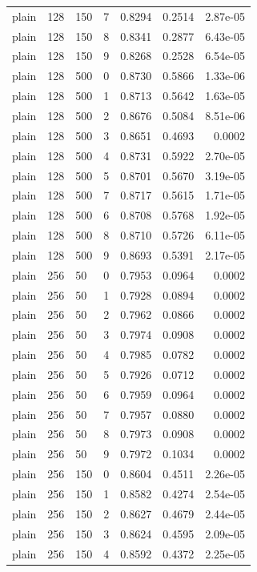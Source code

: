 \begin{footnotesize}
\begin{longtable}{lllrrrr}
plain & 128 & 150 & 7 & 0.8294 & 0.2514 & 2.87e-05 \\
plain & 128 & 150 & 8 & 0.8341 & 0.2877 & 6.43e-05 \\
plain & 128 & 150 & 9 & 0.8268 & 0.2528 & 6.54e-05 \\
plain & 128 & 500 & 0 & 0.8730 & 0.5866 & 1.33e-06 \\
plain & 128 & 500 & 1 & 0.8713 & 0.5642 & 1.63e-05 \\
plain & 128 & 500 & 2 & 0.8676 & 0.5084 & 8.51e-06 \\
plain & 128 & 500 & 3 & 0.8651 & 0.4693 & 0.0002 \\
plain & 128 & 500 & 4 & 0.8731 & 0.5922 & 2.70e-05 \\
plain & 128 & 500 & 5 & 0.8701 & 0.5670 & 3.19e-05 \\
plain & 128 & 500 & 7 & 0.8717 & 0.5615 & 1.71e-05 \\
plain & 128 & 500 & 6 & 0.8708 & 0.5768 & 1.92e-05 \\
plain & 128 & 500 & 8 & 0.8710 & 0.5726 & 6.11e-05 \\
plain & 128 & 500 & 9 & 0.8693 & 0.5391 & 2.17e-05 \\
plain & 256 & 50 & 0 & 0.7953 & 0.0964 & 0.0002 \\
plain & 256 & 50 & 1 & 0.7928 & 0.0894 & 0.0002 \\
plain & 256 & 50 & 2 & 0.7962 & 0.0866 & 0.0002 \\
plain & 256 & 50 & 3 & 0.7974 & 0.0908 & 0.0002 \\
plain & 256 & 50 & 4 & 0.7985 & 0.0782 & 0.0002 \\
plain & 256 & 50 & 5 & 0.7926 & 0.0712 & 0.0002 \\
plain & 256 & 50 & 6 & 0.7959 & 0.0964 & 0.0002 \\
plain & 256 & 50 & 7 & 0.7957 & 0.0880 & 0.0002 \\
plain & 256 & 50 & 8 & 0.7973 & 0.0908 & 0.0002 \\
plain & 256 & 50 & 9 & 0.7972 & 0.1034 & 0.0002 \\
plain & 256 & 150 & 0 & 0.8604 & 0.4511 & 2.26e-05 \\
plain & 256 & 150 & 1 & 0.8582 & 0.4274 & 2.54e-05 \\
plain & 256 & 150 & 2 & 0.8627 & 0.4679 & 2.44e-05 \\
plain & 256 & 150 & 3 & 0.8624 & 0.4595 & 2.09e-05 \\
plain & 256 & 150 & 4 & 0.8592 & 0.4372 & 2.25e-05 \\

\end{longtable}
\end{footnotesize}
